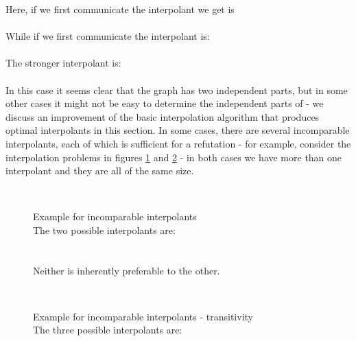 \noindent
Here, if we first communicate  the interpolant we get is\\
\\
While if we first communicate  the interpolant is:\\
\\
The stronger interpolant is: \\
\\
In this case it seems clear that the graph  has two independent parts, but in some other cases it might not be easy to determine the independent parts of  - we discuss an improvement of the basic interpolation algorithm that produces optimal interpolants in this section.
In some cases, there are several incomparable interpolants, each of which is sufficient for a refutation - for example, consider the interpolation problems in figures \ref{example_4.2.1.4} and \ref{example_4.2.1.5} - in both cases we have more than one interpolant and they are all of the same size.

\begin{figure}
\\
\caption{Example for incomparable interpolants\\
The two possible interpolants are:\\
\\
\\
Neither is inherently preferable to the other. 
}
\label{example_4.2.1.4}
\end{figure}


\begin{figure}
\\
\caption{Example for incomparable interpolants - transitivity\\
The three possible interpolants are:\\
\\
\\
\\
}
\label{example_4.2.1.5}
\end{figure}


